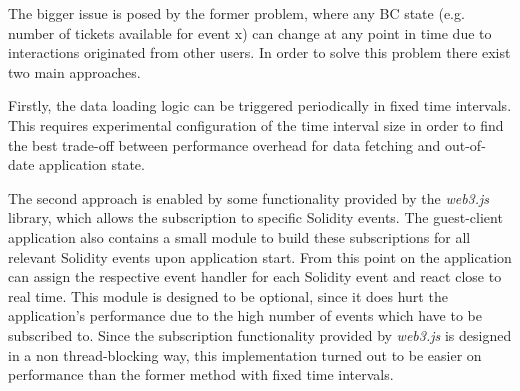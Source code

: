 The bigger issue is posed by the former problem, where any BC state (e.g. number of tickets available for event x) can change at any point in time due to interactions originated from other users. In order to solve this problem there exist two main approaches. 

Firstly, the data loading logic can be triggered periodically in fixed time intervals. This requires experimental configuration of the time interval size in order to find the best trade-off between performance overhead for data fetching and out-of-date application state. 

The second approach is enabled by some functionality provided by the \textit{web3.js} library, which allows the subscription to specific Solidity events. The guest-client application also contains a small module to build these subscriptions for all relevant Solidity events upon application start. From this point on the application can assign the respective event handler for each Solidity event and react close to real time. This module is designed to be optional, since it does hurt the application's performance due to the high number of events which have to be subscribed to. Since the subscription functionality provided by \textit{web3.js} is designed in a non thread-blocking way, this implementation turned out to be easier on performance than the former method with fixed time intervals.

